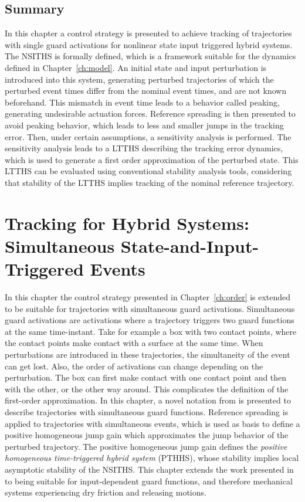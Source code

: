 \documentclass[../DC2017114Bouma.tex]{subfiles}
\begin{document}
\section{Summary}
In this chapter a control strategy is presented to achieve tracking of trajectories with single guard activations for nonlinear state input triggered hybrid systems. The NSITHS is formally defined, which is a framework suitable for the dynamics defined in Chapter~\ref{ch:model}. An initial state and input perturbation is introduced into this system, generating perturbed trajectories of which the perturbed event times differ from the nominal event times, and are not known beforehand. This mismatch in event time leads to a behavior called peaking, generating undesirable actuation forces. Reference spreading is then presented to avoid peaking behavior, which leads to less and smaller jumps in the tracking error. Then, under certain assumptions, a sensitivity analysis is performed. The sensitivity analysis leads to a LTTHS describing the tracking error dynamics, which is used to generate a first order approximation of the perturbed state. This LTTHS can be evaluated using conventional stability analysis tools, considering that stability of the LTTHS implies tracking of the nominal reference trajectory.
\cleartooddpage
\chapter{Tracking for Hybrid Systems: Simultaneous State-and-Input-Triggered Events}\label{ch:simult}
In this chapter the control strategy presented in Chapter~\ref{ch:order} is extended to be suitable for trajectories with simultaneous guard activations. Simultaneous guard activations are activations where a trajectory triggers two guard functions at the same time-instant. Take for example a box with two contact points, where the contact points make contact with a surface at the same time. When perturbations are introduced in these trajectories, the simultaneity of the event can get lost. Also, the order of activations can change depending on the perturbation. The box can first make contact with one contact point and then with the other, or the other way around. This complicates the definition of the first-order approximation. In this chapter, a novel notation from \cite{Rijnen2018} is presented to describe trajectories with simultaneous guard functions. Reference spreading is applied to trajectories with simultaneous events, which is used as basis to define a positive homogeneous jump gain which approximates the jump behavior of the perturbed trajectory. The positive homogeneous jump gain defines the \textit{positive homogeneous time-triggered hybrid system} (PTHHS), whose stability implies local asymptotic stability of the NSITHS. This chapter extends the work presented in \cite{Rijnen2018} to being suitable for input-dependent guard functions, and therefore mechanical systems experiencing dry friction and releasing motions.
\end{document}
